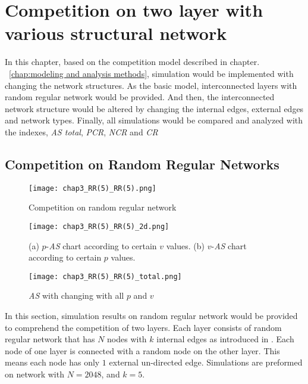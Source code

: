 

\chapter{Competition on two layer with various structural network}
\label{chap:competition on two layer with various structural network}
In this chapter, based on the competition model described in chapter. ~\ref{chap:modeling and analysis methods}, simulation would be implemented with changing the network structures. As the basic model, interconnected layers with random regular network would be provided. And then, the interconnected network structure would be altered by changing the internal edges, external edges and network types. Finally, all simulations would be compared and analyzed with the indexes, \textit{AS total}, \textit{PCR}, \textit{NCR} and \textit{CR}

\section{Competition on Random Regular Networks}
\label{competition on Random Regular Networks}
\begin{figure}[!h]
	\centering
	\texttt{[image: chap3\_RR(5)\_RR(5).png]}
	\caption{Competition on random regular network}
	\label{chap3_RR(5)_RR(5)}
\end{figure}
\begin{figure}[!h]
	\centering
	\texttt{[image: chap3\_RR(5)\_RR(5)\_2d.png]}
	\caption{(a) $p$-\textit{AS} chart according to certain $v$ values. (b) $v$-\textit{AS} chart according to certain $p$ values.}
	\label{chap3_RR(5)_RR(5)_2d}
\end{figure}
\begin{figure}[!h]
	\centering
	\texttt{[image: chap3\_RR(5)\_RR(5)\_total.png]}
	\caption{\textit{AS} with changing with all $p$ and $v$}
	\label{chap3_RR(5)_RR(5)_total}
\end{figure}
In this section, simulation results on random regular network would be provided to comprehend the competition of two layers. Each layer consists of random regular network that has $N$ nodes with $k$ internal edges as introduced in \parencite{kimsangwoo2012, bela2001}. Each node of one layer is connected with a random node on the other layer. This means each node has only $1$ external un-directed edge. Simulations are preformed on network with $N=2048$, and $k = 5$. 

